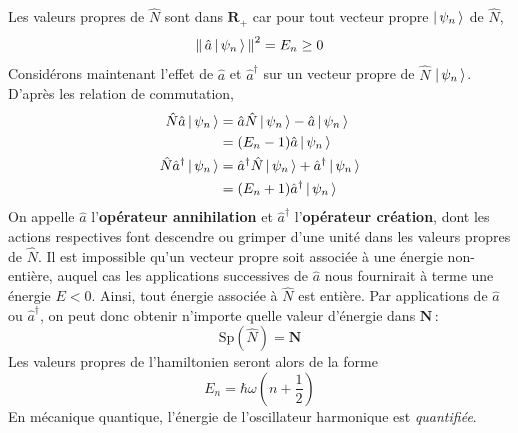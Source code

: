         Les valeurs propres de $\hat{N}$ sont dans $\mathbf{R}_+$ car pour tout vecteur propre $\left| \, \psi_{n} \, \right>$ de $\hat{N}$, 
        \[ \left\lVert \, \hat{a} \left| \, \psi_n \, \right> \, \right\rVert^2 = E_n \geq 0 \]
        Considérons maintenant l’effet de $\hat{a}$ et $\hat{a}^{\dagger}$ sur un vecteur propre de $\hat{N}$ $\left| \, \psi_n \, \right>$. D’après les relation de commutation,
        \begin{align*}
            \hat{N} \hat{a}\left| \, \psi_n \, \right> 
            &= \hat{a} \hat{N} \left| \, \psi_n \, \right> - \hat{a} \left| \, \psi_n \, \right> \\
            &= (E_n - 1) \hat{a}\left| \, \psi_n \, \right> \\
            \hat{N} \hat{a}^{\dagger}\left| \, \psi_n \, \right> 
            &= \hat{a}^{\dagger} \hat{N} \left| \, \psi_n \, \right> + \hat{a}^{\dagger} \left| \, \psi_n \, \right> \\
            &= (E_n + 1) \hat{a}^{\dagger} \left| \, \psi_n \, \right> \\
        \end{align*}
        On appelle $\hat{a}$ l’\textbf{opérateur annihilation} et $\hat{a}^{\dagger}$ l’\textbf{opérateur création}, dont les actions respectives font descendre ou grimper d’une unité dans les valeurs propres de $\hat{N}$. Il est impossible qu’un vecteur propre soit associée à une énergie non-entière, auquel cas les applications successives de $\hat{a}$ nous fournirait à terme une énergie $E < 0$. Ainsi, tout énergie associée à $\hat{N}$ est entière. Par applications de $\hat{a}$ ou $\hat{a}^{\dagger}$, on peut donc obtenir n’importe quelle valeur d’énergie dans $\mathbf{N}$ : 
        \[ \text{Sp}(\hat{N}) = \mathbf{N} \]
        Les valeurs propres de l’hamiltonien seront alors de la forme 
        \[ E_n = \hbar \omega \left(n + \frac{1}{2}\right) \]
        En mécanique quantique, l’énergie de l’oscillateur harmonique est \textit{quantifiée}.


        
